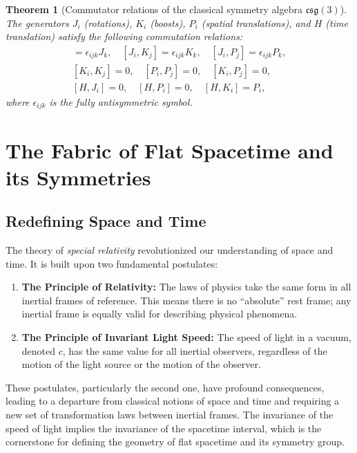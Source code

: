 \documentclass{amsart}
\newtheorem{theorem}{Theorem}[section]
\theoremstyle{definition}
\theoremstyle{remark}
\begin{document}
\begin{theorem}[Commutator relations of the classical symmetry algebra $\mathfrak{csg}(3)$]\label{thm:csg3_commutation_relations}
  The generators \(J_i\) (rotations), \(K_i\) (boosts), \(P_i\) (spatial translations), and \(H\) (time translation) satisfy the following commutation relations:
  \begin{gather*}
    [J_i, J_j] = \epsilon_{ijk} J_k, \quad
    [J_i, K_j] = \epsilon_{ijk} K_k, \quad
    [J_i, P_j] = \epsilon_{ijk} P_k, \\
    [K_i, K_j] = 0, \quad
    [P_i, P_j] = 0, \quad
    [K_i, P_j] = 0, \\
    [H, J_i] = 0, \quad
    [H, P_i] = 0, \quad
    [H, K_i] = P_i,
  \end{gather*}
  where $\epsilon_{ijk}$ is the fully antisymmetric symbol.
\end{theorem}

\section{The Fabric of Flat Spacetime and its Symmetries}
\label{sec:sr}

\subsection{Redefining Space and Time}
\label{subsec:sr_postulates}
The theory of \emph{special relativity} revolutionized our understanding of space and time.
It is built upon two fundamental postulates:

\begin{enumerate}
  \item \textbf{The Principle of Relativity:} The laws of physics take the same form in all inertial frames of reference.
  This means there is no ``absolute'' rest frame; any inertial frame is equally valid for describing physical phenomena.
  \item \textbf{The Principle of Invariant Light Speed:} The speed of light in a vacuum, denoted $c$, has the same value for all inertial observers, regardless of the motion of the light source or the motion of the observer.
\end{enumerate}
These postulates, particularly the second one, have profound consequences, leading to a departure from classical notions of space and time and requiring a new set of transformation laws between inertial frames.
The invariance of the speed of light implies the invariance of the spacetime interval, which is the cornerstone for defining the geometry of flat spacetime and its symmetry group.
\end{document}
